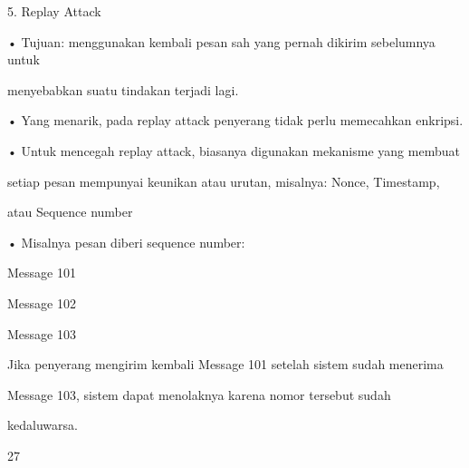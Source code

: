 \documentclass{article}
\begin{document}

5. Replay Attack

• Tujuan: menggunakan kembali pesan sah yang pernah dikirim sebelumnya untuk 

menyebabkan suatu tindakan terjadi lagi.

• Yang menarik, pada replay attack penyerang tidak perlu memecahkan enkripsi.

• Untuk mencegah replay attack, biasanya digunakan mekanisme yang membuat 

setiap pesan mempunyai keunikan atau urutan, misalnya: Nonce, Timestamp, 

atau Sequence number 

• Misalnya pesan diberi sequence number: 

      Message 101

      Message 102

      Message 103

Jika penyerang mengirim kembali Message 101 setelah sistem sudah menerima 

Message 103, sistem dapat menolaknya karena nomor tersebut sudah 

kedaluwarsa.

27
\end{document}
